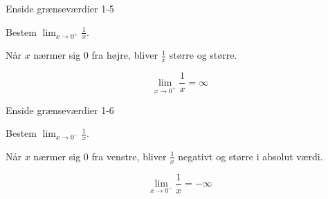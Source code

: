 \documentclass{article}
\begin{document}
\newpage

\begin{exercise}{Enside grænseværdier 1-5}

Bestem $\lim_{x \to 0^+} \frac{1}{x}$.

\answerbox{\infty}

\hint

Når $x$ nærmer sig 0 fra højre, bliver $\frac{1}{x}$ større og større.

\hint
\[
\lim_{x \to 0^+} \frac{1}{x} = \infty
\]

\end{exercise}

\newpage

\begin{exercise}{Enside grænseværdier 1-6}

Bestem $\lim_{x \to 0^-} \frac{1}{x}$.

\answerbox{-\infty}

\hint

Når $x$ nærmer sig 0 fra venstre, bliver $\frac{1}{x}$ negativt og større i absolut værdi.

\hint
\[
\lim_{x \to 0^-} \frac{1}{x} = -\infty
\]

\end{exercise}
\end{document}
